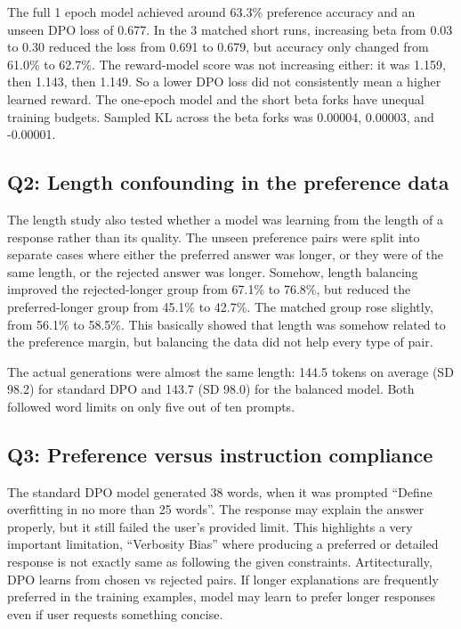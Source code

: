 \documentclass{article}
\begin{document}


The full 1 epoch model achieved around 63.3\% preference accuracy and an unseen DPO loss of 0.677. In the 3 matched short runs, increasing beta from 0.03 to 0.30 reduced the loss from 0.691 to 0.679, but accuracy only changed from 61.0\% to 62.7\%. The reward-model score was not increasing either: it was 1.159, then 1.143, then 1.149. So a lower DPO loss did not consistently mean a higher learned reward.  The one-epoch model and the short beta forks have unequal training budgets. Sampled KL across the beta forks was 0.00004, 0.00003, and -0.00001.

\subsection{Q2: Length confounding in the preference data}

The length study also tested whether a model was learning from the length of a response rather than its quality. The unseen preference pairs were split into separate cases where either the preferred answer was longer, or they were of the same length, or the rejected answer was longer. Somehow, length balancing improved the rejected-longer group from 67.1\% to 76.8\%, but reduced the preferred-longer group from 45.1\% to 42.7\%. The matched group rose slightly, from 56.1\% to 58.5\%. This basically showed that length was somehow related to the preference margin, but balancing the data did not help every type of pair. 

The actual generations were almost the same length: 144.5 tokens on average (SD 98.2) for standard DPO and 143.7 (SD 98.0) for the balanced model. Both followed word limits on only five out of ten prompts.

\subsection{Q3: Preference versus instruction compliance}

The standard DPO model generated 38 words, when it was prompted ``Define overfitting in no more than 25 words''. The response may explain the answer properly, but it still failed the user's provided limit. This highlights a very important limitation, ``Verbosity Bias'' where producing a preferred or detailed response is not exactly same as following the given constraints.
Artitecturally, DPO learns from chosen vs rejected pairs. If longer explanations are frequently  preferred in the training examples, model may learn to prefer longer responses even if user requests something concise.  
\end{document}
